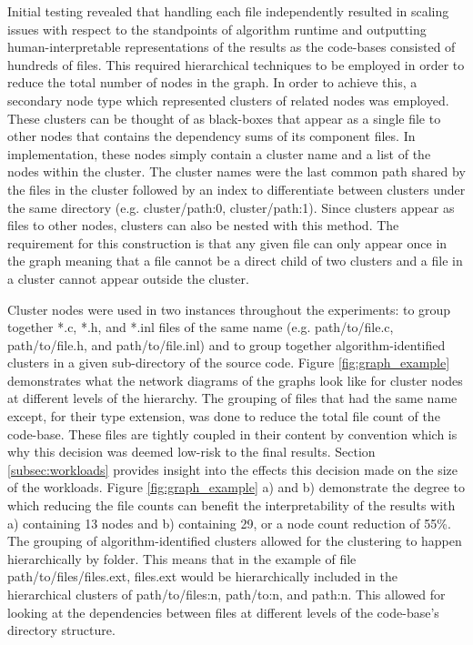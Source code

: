 Initial testing revealed that handling each file independently resulted in scaling issues with respect to the standpoints of algorithm runtime and outputting human-interpretable representations of the results as the code-bases consisted of hundreds of files. This required hierarchical techniques to be employed in order to reduce the total number of nodes in the graph. In order to achieve this, a secondary node type which represented clusters of related nodes was employed. These clusters can be thought of as black-boxes that appear as a single file to other nodes that contains the dependency sums of its component files. In implementation, these nodes simply contain a cluster name and a list of the nodes within the cluster. The cluster names were the last common path shared by the files in the cluster followed by an index to differentiate between clusters under the same directory (e.g. cluster/path:0, cluster/path:1). Since clusters appear as files to other nodes, clusters can also be nested with this method. The requirement for this construction is that any given file can only appear once in the graph meaning that a file cannot be a direct child of two clusters and a file in a cluster cannot appear outside the cluster.

Cluster nodes were used in two instances throughout the experiments: to group together *.c, *.h, and *.inl files of the same name (e.g. path/to/file.c, path/to/file.h, and path/to/file.inl) and to group together algorithm-identified clusters in a given sub-directory of the source code. Figure \ref{fig:graph_example} demonstrates what the network diagrams of the graphs look like for cluster nodes at different levels of the hierarchy. The grouping of files that had the same name except, for their type extension, was done to reduce the total file count of the code-base. These files are tightly coupled in their content by convention which is why this decision was deemed low-risk to the final results. Section \ref{subsec:workloads} provides insight into the effects this decision made on the size of the workloads. Figure \ref{fig:graph_example} a) and b) demonstrate the degree to which reducing the file counts can benefit the interpretability of the results with a) containing 13 nodes and b) containing 29, or a node count reduction of 55\%. The grouping of algorithm-identified clusters allowed for the clustering to happen hierarchically by folder. This means that in the example of file path/to/files/files.ext, files.ext would be hierarchically included in the hierarchical clusters of path/to/files:n, path/to:n, and path:n. This allowed for looking at the dependencies between files at different levels of the code-base's directory structure.


